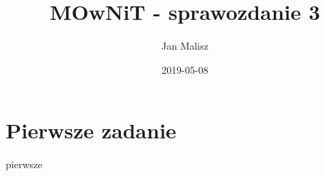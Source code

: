 \documentclass[10pt,a4paper]{article}
\title{MOwNiT - sprawozdanie 3}
\author{Jan Malisz}
\date{2019-05-08}
\begin{document}
  \maketitle
  \thispagestyle{empty}

  \newpage
  \section*{Pierwsze zadanie}\label{sec:PierwszeZadanie}
  {pierwsze}
\end{document}
